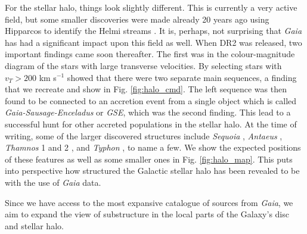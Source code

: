 For the stellar halo, things look slightly different. This is currently a very active field, but some smaller discoveries were made already 20 years ago using Hipparcos to identify the Helmi streams \citep{helmi:99}. It is, perhaps, not surprising that \textit{Gaia} has had a significant impact upon this field as well. When DR2 was released, two important findings came soon thereafter. The first was in the colour-magnitude diagram of the stars with large transverse velocities. By selecting stars with $v_T > 200$ km s$^{-1}$ \cite{dr2:hr} showed that there were two separate main sequences, a finding that we recreate and show in Fig. \ref{fig:halo_cmd}. The left sequence was then found to be connected to an accretion event from a single object \citep{belokurov:18, koppelman:18} which is called \textit{Gaia-Sausage-Enceladus} or \textit{GSE}, which was the second finding. This lead to a successful hunt for other accreted populations in the stellar halo. At the time of writing, some of the larger discovered structures include \textit{Sequoia} \citep{myeong:19}, \textit{Antaeus} \citep{oria:22}, \textit{Thamnos} 1 and 2 \citep{koppelman:19}, and \textit{Typhon} \citep{tenachi:22}, to name a few. We show the expected positions of these features as well as some smaller ones in Fig. \ref{fig:halo_map}. This puts into perspective how structured the Galactic stellar halo has been revealed to be with the use of \textit{Gaia} data.

Since we have access to the most expansive catalogue of sources from \textit{Gaia}, we aim to expand the view of substructure in the local parts of the Galaxy's disc and stellar halo.

